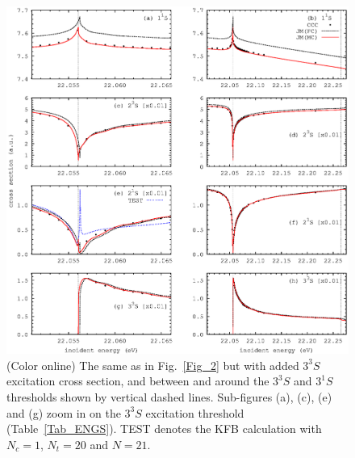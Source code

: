 \documentclass[aip
, pra
, showpacs
, aps
, twocolumn
, groupedaddress
, floatfix
]{revtex4}
\begin{document}
\begin{figure}[htb]
\includegraphics[scale=1]{fig3.ps}
\caption{(Color online)
The same as in Fig.~\ref{Fig_2} but with added $3^3S$ excitation cross section, and
between and around the $3^3S$ and $3^1S$ thresholds shown by vertical dashed lines.
Sub-figures (a), (c), (e) and (g) zoom in on the $3^3S$ excitation threshold (Table~\ref{Tab_ENGS}).
TEST denotes the KFB calculation with $N_c=1$, $N_t=20$ and $N=21$.
}
\label{Fig_3}
\end{figure}
\end{document}
